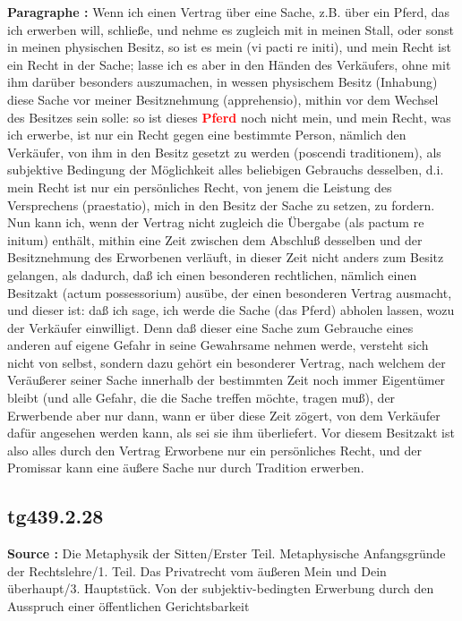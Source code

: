 \documentclass[a4paper,12pt,twoside]{book}
\newcommand{\match}[1]{\textcolor{red}{\textbf{#1}}}
\begin{document}
	\textbf{Paragraphe : }Wenn ich einen Vertrag über eine Sache, z.B. über ein Pferd, das ich erwerben will, schließe, und nehme es zugleich mit in meinen Stall, oder sonst in meinen physischen Besitz, so ist es mein (vi pacti re initi), und mein Recht ist ein Recht in der Sache; lasse ich es aber in den Händen des Verkäufers, ohne mit ihm darüber besonders auszumachen, in wessen physischem Besitz (Inhabung) diese Sache vor meiner Besitznehmung (apprehensio), mithin vor dem Wechsel des Besitzes sein solle: so ist dieses \match{Pferd} noch nicht mein, und mein Recht, was ich erwerbe, ist nur ein Recht gegen eine bestimmte Person, nämlich den Verkäufer, von ihm in den Besitz gesetzt zu werden (poscendi traditionem), als subjektive Bedingung der Möglichkeit alles beliebigen Gebrauchs desselben, d.i. mein Recht ist nur ein persönliches Recht, von jenem die Leistung des Versprechens (praestatio), mich in den Besitz der Sache zu setzen, zu fordern. Nun kann ich, wenn der Vertrag nicht zugleich die Übergabe (als pactum re initum) enthält, mithin eine Zeit zwischen dem Abschluß desselben und der Besitznehmung des Erworbenen verläuft, in dieser Zeit nicht anders zum Besitz gelangen, als dadurch, daß ich einen besonderen rechtlichen, nämlich einen Besitzakt (actum possessorium) ausübe, der einen besonderen Vertrag ausmacht, und dieser ist: daß ich sage, ich werde die Sache (das Pferd) abholen lassen, wozu der Verkäufer einwilligt. Denn daß dieser eine Sache zum Gebrauche eines anderen auf eigene Gefahr in seine Gewahrsame nehmen werde, versteht sich nicht von selbst, sondern dazu gehört ein besonderer Vertrag, nach welchem der Veräußerer seiner Sache innerhalb der bestimmten Zeit noch immer Eigentümer bleibt (und alle Gefahr, die die Sache treffen möchte, tragen muß), der Erwerbende aber nur dann, wann er über diese Zeit zögert, von dem Verkäufer dafür angesehen werden kann, als sei sie ihm überliefert. Vor diesem Besitzakt ist also alles durch den Vertrag Erworbene nur ein persönliches Recht, und der Promissar kann eine äußere Sache nur durch Tradition erwerben. 
	
	\subsection*{tg439.2.28} 
	\textbf{Source : }Die Metaphysik der Sitten/Erster Teil. Metaphysische Anfangsgründe der Rechtslehre/1. Teil. Das Privatrecht vom äußeren Mein und Dein überhaupt/3. Hauptstück. Von der subjektiv-bedingten Erwerbung durch den Ausspruch einer öffentlichen Gerichtsbarkeit\\  
	
\end{document}
